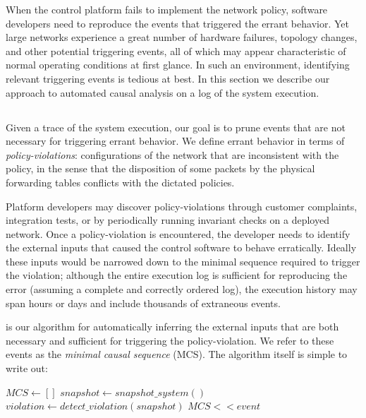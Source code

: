 When the control platform fails to implement the network policy, software
developers need to reproduce the events that triggered the errant behavior.
Yet large networks experience a great number of hardware failures, topology changes,
and other potential triggering events,
all of which may appear characteristic of normal operating
conditions at first glance. In such an environment, identifying relevant
triggering events is tedious at best. In this section we describe our approach
to automated causal
analysis on a log of the system execution. 

\subsection{\SIMULATOR{}}
\label{sec:causal_analysis}

Given a trace of the system execution, our goal is to prune events that are not necessary for triggering
errant behavior. We define errant behavior in terms of {\em policy-violations}: 
configurations of the network that are inconsistent
with the policy, in the sense that the disposition of some packets by the
physical forwarding tables conflicts with the dictated policies.

Platform developers may discover policy-violations
through customer complaints, integration tests, or by periodically running
invariant checks on a deployed network. Once a 
policy-violation is encountered, the developer needs to
identify the external inputs that caused the control software to behave
erratically. Ideally these inputs would be narrowed
down to the minimal sequence required to trigger the violation; although the entire
execution log is sufficient for reproducing the error (assuming
a complete and correctly ordered log), the execution history may span
hours or days and include thousands of extraneous events.

\Simulator{} is our algorithm for automatically inferring the external inputs
that are both necessary and sufficient for triggering the policy-violation. We
refer to these events as the {\em minimal causal sequence} (MCS). The algorithm itself is
simple to write out:

\begin{algorithmic}
\State $MCS \gets []$
    \State $snapshot \gets snapshot\_system()$
    \State $violation \gets detect\_violation(snapshot)$
        \State $MCS << event$
    \EndIf
\EndFor
\end{algorithmic}

